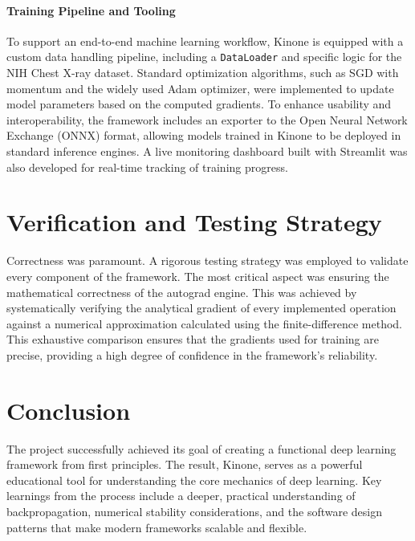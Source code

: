 \documentclass[a4paper]{article}
\begin{document}
\paragraph{Training Pipeline and Tooling}
To support an end-to-end machine learning workflow, Kinone is equipped with a custom data handling pipeline, including a \texttt{DataLoader} and specific logic for the NIH Chest X-ray dataset. Standard optimization algorithms, such as SGD with momentum and the widely used Adam optimizer, were implemented to update model parameters based on the computed gradients. To enhance usability and interoperability, the framework includes an exporter to the Open Neural Network Exchange (ONNX) format, allowing models trained in Kinone to be deployed in standard inference engines. A live monitoring dashboard built with Streamlit was also developed for real-time tracking of training progress.

\section*{Verification and Testing Strategy}

Correctness was paramount. A rigorous testing strategy was employed to validate every component of the framework. The most critical aspect was ensuring the mathematical correctness of the autograd engine. This was achieved by systematically verifying the analytical gradient of every implemented operation against a numerical approximation calculated using the finite-difference method. This exhaustive comparison ensures that the gradients used for training are precise, providing a high degree of confidence in the framework's reliability.

\section*{Conclusion}

The project successfully achieved its goal of creating a functional deep learning framework from first principles. The result, Kinone, serves as a powerful educational tool for understanding the core mechanics of deep learning. Key learnings from the process include a deeper, practical understanding of backpropagation, numerical stability considerations, and the software design patterns that make modern frameworks scalable and flexible.
\end{document}
